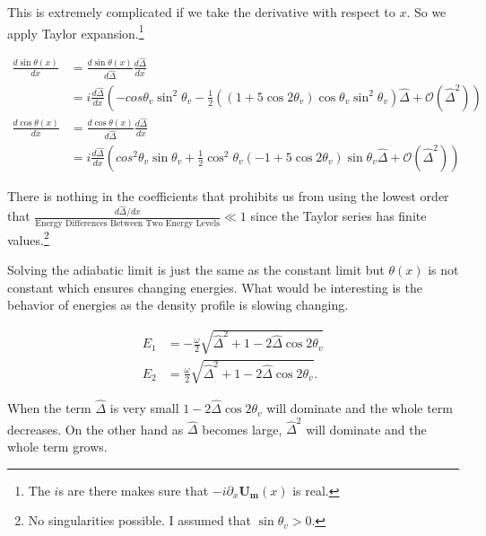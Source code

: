 \documentclass{tufte-handout}
\begin{document}
This is extremely complicated if we take the derivative with respect to $x$. So we apply Taylor expansion.\footnote{The $i$s are there makes sure that $-i\partial_x \mathbf{U_m}(x)$ is real.}

\begin{align*}
\frac{d \sin \theta(x)}{dx} &= \frac{d\sin \theta(x)}{d\hat\Delta}\frac{d\hat\Delta}{dx} \\
& = i \frac{d\hat\Delta}{dx} \left(  -cos\theta_v\sin^2\theta_v -\frac{1}{2} ( (1+5\cos 2\theta_v) \cos\theta_v \sin^2\theta_v ) \hat\Delta + \mathcal{O}(\hat\Delta^2) \right) \\
\frac{d\cos\theta(x)}{dx} & = \frac{d\cos\theta(x)}{d\hat\Delta}\frac{d\hat\Delta}{dx} \\
& = i \frac{d\hat\Delta}{dx}\left( cos^2\theta_v\sin\theta_v + \frac{1}{2}\cos^2\theta_v(-1+5\cos 2\theta_v) \sin\theta_v \hat\Delta + \mathcal{O}(\hat\Delta^2) \right)
\end{align*}

There is nothing in the coefficients that prohibits us from using the lowest order that $\frac{d\hat\Delta /dx}{\text{Energy Differences Between Two Energy Levels}}\ll 1$ since the Taylor series has finite values.\footnote{No singularities possible. I assumed that $\sin \theta_v >0$. }

Solving the adiabatic limit is just the same as the constant limit but $\theta(x)$ is not constant which ensures changing energies. What would be interesting is the behavior of energies as the density profile is slowing changing.

\begin{align*}
E_1 & = -\frac{\omega}{2}\sqrt{\hat\Delta^2 + 1 - 2 \hat\Delta  \cos 2\theta_v} \\
E_2 & = \frac{\omega}{2}\sqrt{\hat\Delta^2 + 1 - 2 \hat\Delta  \cos 2\theta_v}.
\end{align*}

When the term $\hat\Delta$ is very small $1-2\hat\Delta\cos 2\theta_v$ will dominate and the whole term decreases. On the other hand as $\hat\Delta$ becomes large, $\hat\Delta^2$ will dominate and the whole term grows.
\end{document}
